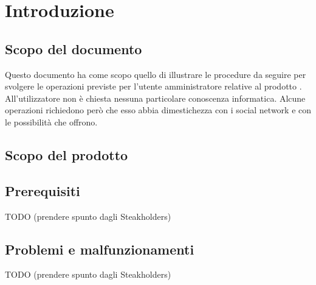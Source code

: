 %


\section{Introduzione} %
\label{sec:introduzione}
	\subsection{Scopo del documento} %
	\label{sub:scopo_del_documento}
	Questo documento ha come scopo quello di illustrare le procedure da seguire per svolgere le operazioni previste per l'utente amministratore relative al prodotto \projectName. All'utilizzatore non è chiesta nessuna particolare conoscenza informatica. Alcune operazioni richiedono però che esso abbia dimestichezza con i social network e con le possibilità che offrono.

	\subsection{Scopo del prodotto} %
	\label{sub:scopo_del_prodotto}
	\productScope

	\subsection{Prerequisiti} %
	\label{sub:prerequisiti}
	TODO (prendere spunto dagli Steakholders)

	\subsection{Problemi e malfunzionamenti} %
	\label{sub:problemi_e_malfunzionamenti}
	TODO (prendere spunto dagli Steakholders)

